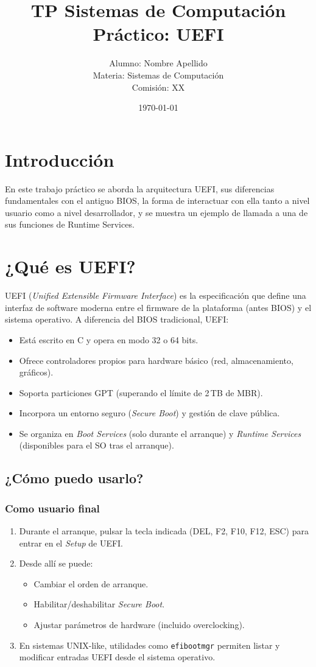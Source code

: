 \documentclass[a4paper,12pt]{article}
\title{\textbf{TP Sistemas de Computación}\\\large Práctico: UEFI}
\author{Alumno: Nombre Apellido \\ Materia: Sistemas de Computación \\ Comisión: XX}
\date{\today}
\begin{document}
\maketitle
\thispagestyle{empty}
\clearpage
\tableofcontents
\clearpage

\section{Introducción}
En este trabajo práctico se aborda la arquitectura UEFI, sus diferencias fundamentales con el antiguo BIOS, la forma de interactuar con ella tanto a nivel usuario como a nivel desarrollador, y se muestra un ejemplo de llamada a una de sus funciones de Runtime Services.

\section{¿Qué es UEFI?}
UEFI (\emph{Unified Extensible Firmware Interface}) es la especificación que define una interfaz de software moderna entre el firmware de la plataforma (antes BIOS) y el sistema operativo. A diferencia del BIOS tradicional, UEFI:
\begin{itemize}[noitemsep]
  \item Está escrito en C y opera en modo 32 o 64 bits.
  \item Ofrece controladores propios para hardware básico (red, almacenamiento, gráficos).
  \item Soporta particiones GPT (superando el límite de 2\,TB de MBR).
  \item Incorpora un entorno seguro (\emph{Secure Boot}) y gestión de clave pública.
  \item Se organiza en \emph{Boot Services} (solo durante el arranque) y \emph{Runtime Services} (disponibles para el SO tras el arranque).
\end{itemize}

\subsection{¿Cómo puedo usarlo?}
\subsubsection{Como usuario final}
\begin{enumerate}[noitemsep]
  \item Durante el arranque, pulsar la tecla indicada (DEL, F2, F10, F12, ESC) para entrar en el \emph{Setup} de UEFI.
  \item Desde allí se puede:
    \begin{itemize}[noitemsep]
      \item Cambiar el orden de arranque.
      \item Habilitar/deshabilitar \emph{Secure Boot}.
      \item Ajustar parámetros de hardware (incluido overclocking).
    \end{itemize}
  \item En sistemas UNIX-like, utilidades como \texttt{efibootmgr} permiten listar y modificar entradas UEFI desde el sistema operativo.
\end{enumerate}
\end{document}
